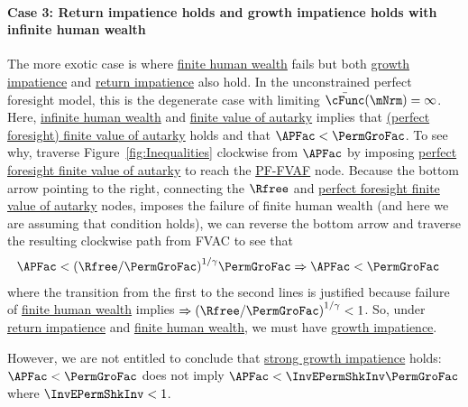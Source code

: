 \documentclass[BufferStockTheory]{subfiles}
\begin{document}
\paragraph{Case 3: Return impatience holds and growth impatience holds with infinite human wealth} The more exotic case is where \hyperlink{FHWC}{finite human wealth} fails but both \hyperlink{GIC}{growth impatience} and \hyperlink{RIC}{return impatience} also hold.
In the unconstrained perfect foresight model, this is the degenerate case with limiting $\bar{\cFunc}(\mNrm)=\infty$.
Here, \hyperlink{FHWC}{infinite human wealth} and \hyperlink{FVAC}{finite value of autarky} implies that \hyperlink{PFFVAC}{(perfect foresight) finite value of autarky} holds and that $ \APFac < \PermGroFac$.
To see why, traverse Figure~\ref{fig:Inequalities} clockwise from $\APFac$ by imposing \hyperlink{PFFVAC}{perfect foresight finite value of autarky} to reach the \hyperlink{PFFVAF}{PF-FVAF}  node.
Because the bottom arrow pointing to the right, connecting the $\Rfree$ and \hyperlink{PFFVAF}{perfect foresight finite value of autarky} nodes, imposes the failure of finite human wealth (and here we are assuming that condition holds), we can reverse the bottom arrow and traverse the resulting clockwise path from {FVAC} to see that 
%
\begin{equation}\begin{gathered}\begin{aligned}
  & \APFac < {(\Rfree/\PermGroFac)}^{1/\CRRA}\PermGroFac \Rightarrow  \APFac < \PermGroFac
\end{aligned}\end{gathered}\end{equation}
%
where the transition from the first to the second lines is justified because failure of \hyperlink{FHWC}{finite human wealth} implies $\Rightarrow {(\Rfree/\PermGroFac)}^{1/\CRRA}<1$.
So, under \hyperlink{RIC}{return impatience} and \hyperlink{FHWC}{finite human wealth}, we must have \hyperlink{GIC}{growth impatience}.

However, we are not entitled to conclude that \hyperlink{GICMod}{strong growth impatience} holds: $\APFac < \PermGroFac$ does not imply $\APFac < \InvEPermShkInv \PermGroFac$ where $\InvEPermShkInv<1$.
 
\end{document}
